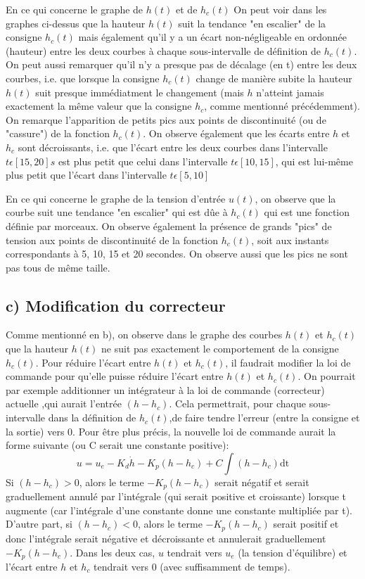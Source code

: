 \newpage \noindent En ce qui concerne le graphe de $h(t)$ et de $h_c(t)$ On peut voir dans les graphes ci-dessus que la hauteur $h(t)$ suit la tendance "en escalier" de la consigne $h_{c}(t)$ mais également qu'il y a un écart non-négligeable en ordonnée (hauteur) entre les deux courbes à chaque sous-intervalle de définition de $h_{c}(t)$. On peut aussi remarquer qu'il n'y a presque pas de décalage (en t) entre les deux courbes, i.e. que lorsque la consigne $h_{c}(t)$ change de manière subite la hauteur $h(t)$ suit presque immédiatment le changement (mais $h$ n'atteint jamais exactement la même valeur que la consigne $h_c$, comme mentionné précédemment). On remarque l'apparition de petits pics aux points de discontinuité (ou de "cassure") de la fonction $h_{c}(t)$. On observe également que les écarts entre $h$ et $h_c$ sont décroissants, i.e. que l'écart entre les deux courbes dans l'intervalle $t \epsilon [15,20]s$ est plus petit que celui dans l'intervalle $t \epsilon [10,15]$, qui est lui-même plus petit que l'écart dans l'intervalle $t \epsilon [5,10]$ \vspace{0.5cm}

 
\noindent En ce qui concerne le graphe de la tension d'entrée $u(t)$, on observe que la courbe suit une tendance "en escalier" qui est dûe à $h_c(t)$ qui est une fonction définie par morceaux. On observe également la présence de grands "pics" de tension aux points de discontinuité de la fonction $h_c(t)$, soit aux instants correspondants à 5, 10, 15 et 20 secondes. On observe aussi que les pics ne sont pas tous de même taille.

\subsection*{c) Modification du correcteur}
Comme mentionné en b), on observe dans le graphe des courbes $h(t)$ et $h_c(t)$ que la hauteur $h(t)$ ne suit pas exactement le comportement de la consigne $h_c(t)$. Pour réduire l'écart entre $h(t)$ et $h_c(t)$, il faudrait modifier la loi de commande pour qu'elle puisse réduire l'écart entre $h(t)$ et $h_c(t)$. On pourrait par exemple additionner un intégrateur à la loi de commande (correcteur) actuelle ,qui aurait l'entrée $(h-h_{c})$. Cela permettrait, pour chaque sous-intervalle dans la définition de $h_c(t)$,de faire tendre l'erreur (entre la consigne et la sortie) vers 0. Pour être plus précis, la nouvelle loi de commande aurait la forme suivante (ou C serait une constante positive): $$u = u_{e}-K_{d}\dot h-K_{p}(h-h_c)+C\int (h-h_c)\text{dt}$$ Si $(h-h_c)>0$, alors le terme $-K_{p}(h-h_c)$ serait négatif et serait graduellement annulé par l'intégrale (qui serait positive et croissante) lorsque t augmente (car l'intégrale d'une constante donne une constante multipliée par t). D'autre part, si $(h-h_c)<0$, alors le terme $-K_{p}(h-h_c)$ serait positif et donc l'intégrale serait négative et décroissante et annulerait graduellement $-K_{p}(h-h_c)$. Dans les deux cas, $u$ tendrait vers $u_e$ (la tension d'équilibre) et l'écart entre $h$ et $h_c$ tendrait vers 0 (avec suffisamment de temps).
